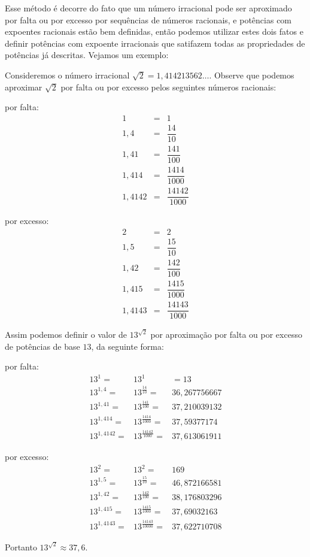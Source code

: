  Esse método é decorre do fato que um número irracional pode ser aproximado por falta ou por excesso por sequências de números racionais, e potências com expoentes racionais estão bem definidas, então podemos utilizar estes dois fatos e definir potências com expoente irracionais que satifazem todas as propriedades de potências já descritas. Vejamos um exemplo:

 \begin{exem}
 Consideremos o número irracional $\sqrt{2}= 1,414213562\ldots$. Observe que podemos aproximar $\sqrt{2}$ por falta ou por excesso pelos seguintes números racionais:

 \begin{multicols}{2}
 por falta:
 \begin{eqnarray*}
 1 &=& 1\\
 1,4 &=& \dfrac{14}{10} \\
 1,41 &=& \dfrac{141}{100} \\
 1,414 &=& \dfrac{1414}{1000} \\
 1,4142 &=& \dfrac{14142}{1000}
 \end{eqnarray*}

 por excesso:
 \begin{eqnarray*}
 2 &=& 2\\
 1,5 &=& \dfrac{15}{10} \\
 1,42 &=& \dfrac{142}{100} \\
 1,415 &=& \dfrac{1415}{1000} \\
 1,4143 &=& \dfrac{14143}{1000}
 \end{eqnarray*}
 \end{multicols}

 Assim podemos definir o valor de $13^{\sqrt{2}}$ por aproximação por falta ou por excesso de potências de base $13$, da seguinte forma:

 por falta:
 \begin{eqnarray*}
 13^1 =& 13^1 &= 13\\
 13^{1,4} =& 13^{\frac{14}{10}} =& 36,267756667 \\
 13^{1,41} =& 13^{\frac{141}{100}} =& 37,210039132 \\
 13^{1,414} =& 13^{\frac{1414}{1000}} =& 37,59377174 \\
 13^{1,4142} =& 13^{\frac{14142}{1000}} =& 37,613061911
 \end{eqnarray*}

 por excesso:
 \begin{eqnarray*}
 13^{2} =& 13^{2} =& 169 \\
 13^{1,5} =& 13^{\frac{15}{10}} =& 46,872166581 \\
 13^{1,42} =& 13^{\frac{142}{100}} =& 38,176803296\\
 13^{1,415} =& 13^{\frac{1415}{1000}} =& 37,69032163 \\
 13^{1,4143} =& 13^{\frac{14143}{10000}} =& 37,622710708
 \end{eqnarray*}

 Portanto $13^{\sqrt{2}} \approx 37,6$.
 \end{exem}

